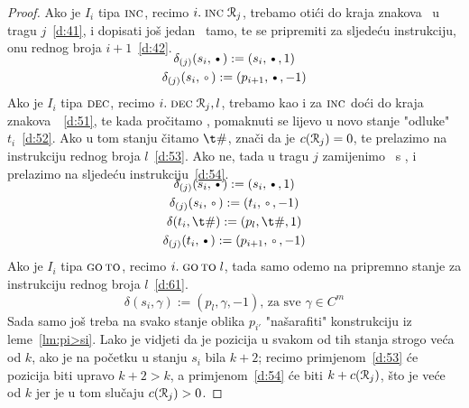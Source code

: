 \begin{proof}
Ako je $I_i$ tipa $\textsc{inc}$, recimo  $i.\;\textsc{inc}\;\mathcal R_{j}$, trebamo otići do kraja znakova \textbullet\ u tragu $j$~\eqref{d:41}, i dopisati još jedan \textbullet\ tamo, te se pripremiti za sljedeću instrukciju, onu rednog broja $i+1$~\eqref{d:42}.
\begin{gather}
\SwapAboveDisplaySkip
\label{d:41}
    \delta_{(j)}(s_i,\text\textbullet):=(s_i,\text\textbullet,1)\\
\label{d:42}
    \delta_{(j)}(s_i,\text\textopenbullet):=(p_{i+1},\text\textbullet,-1)
\end{gather}
Ako je $I_i$ tipa $\textsc{dec}$, recimo $i.\;\textsc{dec}\;\mathcal R_{j},l$, trebamo kao i za $\textsc{inc}$ doći do kraja znakova~\textbullet~\eqref{d:51}, te kada pročitamo \textopenbullet, pomaknuti se lijevo u novo stanje "odluke" $t_i$~\eqref{d:52}. Ako u tom stanju čitamo $\t\#$, znači da je $c(\mathcal R_{j})=0$, te prelazimo na instrukciju rednog broja $l$~\eqref{d:53}. Ako ne, tada u tragu $j$ zamijenimo \textbullet\ s \textopenbullet, i prelazimo na sljedeću instrukciju~\eqref{d:54}.
\begin{gather}
\SwapAboveDisplaySkip
\label{d:51}
    \delta_{(j)}(s_i,\text\textbullet):=(s_i,\text\textbullet,1)\\
\label{d:52}
    \delta_{(j)}(s_i,\text\textopenbullet):=(t_i,\text\textopenbullet,-1)\\
\label{d:53}
    \delta(t_i,\t\#):=(p_l,\t\#,1)\\
\label{d:54}
    \delta_{(j)}(t_i,\text\textbullet):=(p_{i+1},\text\textopenbullet,-1)
\end{gather}
Ako je $I_i$ tipa $\textsc{go\,to}$, recimo $i.\;\textsc{go\,to}\;l$, tada samo odemo na pripremno stanje za instrukciju rednog broja $l$~\eqref{d:61}.
\begin{equation}
\label{d:61}
    \delta(s_i,\gamma):=(p_l,\gamma,-1)\text{, za sve $\gamma\in C^m$}
\end{equation}
Sada samo još treba na svako stanje oblika $p_{i'}$ "našarafiti" konstrukciju iz leme~\ref{lm:pi>si}. Lako je vidjeti da je pozicija u svakom od tih stanja strogo veća od $k$, ako je na početku u stanju $s_i$ bila $k+2$; recimo primjenom~\eqref{d:53} će pozicija biti upravo $k+2>k$, a primjenom~\eqref{d:54} će biti $k+c(\mathcal R_{j})$, što je veće od $k$ jer je u tom slučaju $c(\mathcal R_{j})>0$.
\end{proof}


